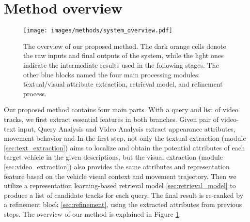 \section{Method overview}
\label{sec:method_overview}
\begin{figure}[!htb]
    \centering
    \texttt{[image: images/methods/system\_overview.pdf]}
    \caption{The overview of our proposed method. The dark orange cells denote the raw inputs and final outputs of the system, while the light ones indicate the intermediate results used in the following stages. The other blue blocks named the four main processing modules: textual/visual attribute extraction, retrieval model, and refinement process.}
    \label{fig:method_overview}
\end{figure}
Our proposed method contains four main parts. With a query and list of video tracks, we first extract essential features in both branches. 
Given pair of video-text input, Query Analysis and Video Analysis extract appearance attributes, movement behavior and 
In the first step, not only the textual extraction (module \ref{sec:text_extraction}) aims to localize and obtain the potential attributes of each target vehicle in the given descriptions, but the visual extraction (module \ref{sec:video_extraction}) also provides the same attributes and representation feature based on the vehicle visual context and movement trajectory. 
Then we utilize a representation learning-based retrieval model \ref{sec:retrieval_model} to produce a list of candidate tracks for each query. 
The final result is re-ranked by a refinement block \ref{sec:refinement}, using the extracted attributes from previous steps. The overview of our method is explained in Figure \ref{fig:method_overview}.
